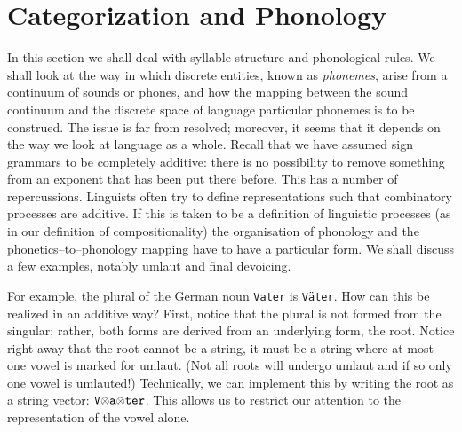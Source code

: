 \section{Categorization and Pho\-no\-logy}
\label{kap5-3}
%
%
%
\nocite{birdellison:onelevel}
In this section we shall deal with syllable structure and phonological
rules. We shall look at the way in which discrete entities, known as 
{\it phonemes}, arise from a continuum of sounds or phones, and how the 
mapping between the sound continuum and the discrete space of language 
particular phonemes is to be construed. The issue is far from 
resolved; moreover, it seems that it depends on the way we look 
at language as a whole. Recall that we have assumed sign grammars
to be completely additive: there is no possibility to remove
something from an exponent that has been put there before. This 
has a number of repercussions. Linguists often try to define 
representations such that combinatory processes are additive. If 
this is taken to be a definition of linguistic processes (as in our 
definition of compositionality) the organisation of phonology and 
the phonetics--to--phonology mapping have to have a particular form. 
We shall discuss a few examples, notably 
umlaut and final devoicing. 

For example, the plural of the German noun {\tt Vater} is {\tt V\"ater}. 
How can this be realized in an additive way? First, notice that the 
plural is not formed from the singular; rather, both forms are derived 
from an underlying form, the root. Notice right away that the root 
cannot be a string, it must be a string where at most one vowel is marked 
for umlaut. (Not all roots will undergo umlaut and if so only 
one vowel is umlauted!) Technically, we can implement this by writing 
the root as a string vector: 
$\mbox{\tt V}\mbox{\small$\otimes$}\mbox{\tt a}\mbox{\small$\otimes$}\mbox{\tt ter}$. 
This allows us to restrict our attention to the representation 
of the vowel alone. 


